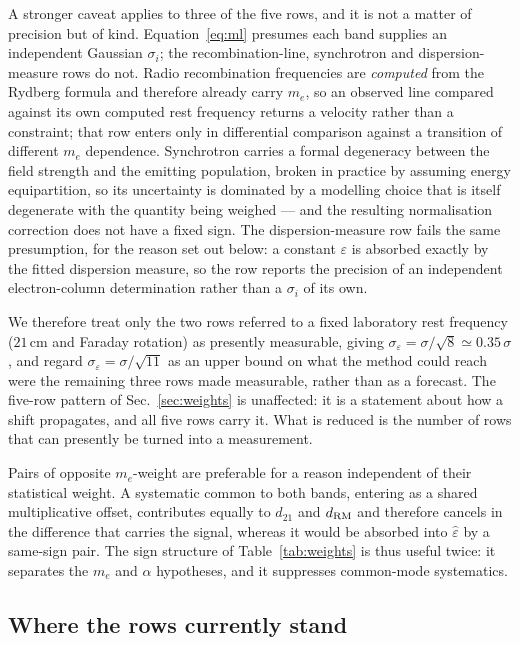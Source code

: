 \documentclass[aps,prd,twocolumn,superscriptaddress,nofootinbib,10pt]{revtex4-2}
\begin{document}
A stronger caveat applies to three of the five rows, and it is not a matter of precision but of
kind. Equation~\eqref{eq:ml} presumes each band supplies an independent Gaussian $\sigma_i$;
the recombination-line, synchrotron and dispersion-measure rows do not. Radio recombination
frequencies are
\emph{computed} from the Rydberg formula and therefore already carry $m_e$, so an observed line
compared against its own computed rest frequency returns a velocity rather than a constraint;
that row enters only in differential comparison against a transition of different $m_e$
dependence. Synchrotron carries a formal degeneracy between the field strength and the emitting
population, broken in practice by assuming energy equipartition, so its uncertainty is dominated
by a modelling choice that is itself degenerate with the quantity being weighed --- and the
resulting normalisation correction does not have a fixed sign. The dispersion-measure row fails the
same presumption, for the reason set out below: a constant $\varepsilon$ is absorbed exactly by the
fitted dispersion measure, so the row reports the precision of an independent electron-column
determination rather than a $\sigma_i$ of its own.

We therefore treat only the two rows referred to a fixed laboratory rest frequency ($21\,$cm and
Faraday rotation) as presently measurable, giving $\sigma_{\varepsilon} = \sigma/\sqrt{8} \simeq
0.35\,\sigma$, and regard $\sigma_{\varepsilon} = \sigma/\sqrt{11}$ as an upper bound on what the
method could reach were the remaining three rows made measurable, rather than as a forecast. The
five-row pattern of Sec.~\ref{sec:weights} is unaffected: it is a statement about how a shift
propagates, and all five rows carry it. What is reduced is the number of rows that can presently be
turned into a measurement.

Pairs of opposite $m_e$-weight are preferable for a reason independent of their statistical
weight. A systematic common to both bands, entering as a shared multiplicative offset, contributes
equally to $d_{21}$ and $d_{\rm RM}$ and therefore cancels in the difference that carries the
signal, whereas it would be absorbed into $\hat{\varepsilon}$ by a same-sign pair. The sign
structure of Table~\ref{tab:weights} is thus useful twice: it separates the $m_e$ and $\alpha$
hypotheses, and it suppresses common-mode systematics.

\subsection{Where the rows currently stand}
\end{document}
